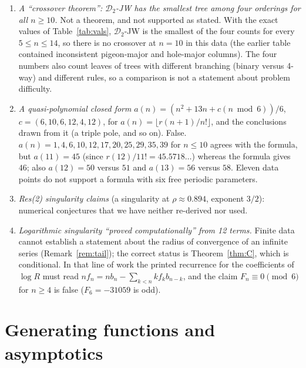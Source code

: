 \documentclass[11pt]{article}
\theoremstyle{definition}
\theoremstyle{remark}
\begin{document}
\begin{enumerate}
  every finite prefix is annihilated by some larger ODE). Furthermore the text defined the sequence by a diagonal
  order with Jeroslow--Wang scoring, whereas the tabulated numbers are those of the static anti-diagonal order
  defined here. We have no result on the type of singularity of the anti-diagonal generating function.
\item \emph{A ``crossover theorem'': $\mathcal D_2$-JW has the smallest tree among four orderings for all $n\ge10$.} Not a
  theorem, and not supported as stated. With the exact values of Table~\ref{tab:vals}, $\mathcal D_2$-JW is the smallest of the four counts for every
  $5\le n\le14$, so there is no crossover at $n=10$ in this data (the earlier table contained inconsistent pigeon-major and hole-major columns).
  The four numbers also count leaves of trees with different branching (binary versus 4-way) and
  different rules, so a comparison is not a statement about problem difficulty.
\item \emph{A quasi-polynomial closed form} $a(n)=(n^2+13n+c(n\bmod6))/6$, $c=(6,10,6,12,4,12)$, for $a(n)=\lfloor r(n{+}1)/n!\rfloor$,
  and the conclusions drawn from it (a triple pole, and so on). False. $a(n)=1,4,6,10,12,17,20,25,29,35,39$ for $n\le10$ agrees with the formula, but
  $a(11)=45$ (since $r(12)/11!=45.5718\dots$) whereas the formula gives $46$; also $a(12)=50$ versus $51$ and $a(13)=56$ versus $58$. Eleven
  data points do not support a formula with six free periodic parameters.
\item \emph{Res(2) singularity claims} (a singularity at $\rho\approx0.894$, exponent $3/2$): numerical conjectures that we have neither
  re-derived nor used.
\item \emph{Logarithmic singularity ``proved computationally'' from 12 terms.} Finite data cannot establish a statement about the
  radius of convergence of an infinite series (Remark~\ref{rem:tail}); the correct status is Theorem~\ref{thm:C}, which is conditional.
  In that line of work the printed recurrence for the coefficients of $\log R$ must read $nf_n=nb_n-\sum_{k<n}kf_kb_{n-k}$, and the claim
  $F_n\equiv0\pmod 6$ for $n\ge4$ is false ($F_6=-31059$ is odd).
\end{enumerate}

\section{Generating functions and asymptotics}\label{sec:asym}
\end{document}
